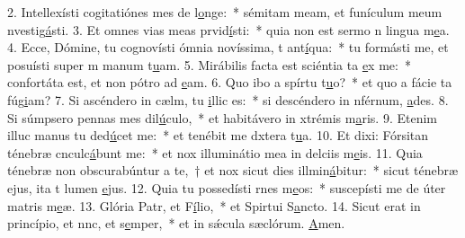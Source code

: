2. Intellexísti cogitatiónes mes de l\uline{o}nge:~* sémitam meam, et funículum meum nvestig\uline{á}sti.
3. Et omnes vias meas prvid\uline{í}sti:~* quia non est sermo n lingua m\uline{e}a.
4. Ecce, Dómine, tu cognovísti ómnia novíssima, t ant\uline{í}qua:~* tu formásti me, et posuísti super m manum t\uline{u}am.
5. Mirábilis facta est sciéntia ta \uline{e}x me:~* confortáta est, et non pótro ad \uline{e}am.
6. Quo ibo a spírtu t\uline{u}o?~* et quo a fácie ta fúg\uline{i}am?
7. Si ascéndero in cælm, tu \uline{i}llic es:~* si descéndero in nférnum, \uline{a}des.
8. Si súmpsero pennas mes dil\uline{ú}culo,~* et habitávero in xtrémis m\uline{a}ris.
9. Etenim illuc manus tu ded\uline{ú}cet me:~* et tenébit me dxtera t\uline{u}a.
10. Et dixi: Fórsitan ténebræ cnculc\uline{á}bunt me:~* et nox illuminátio mea in delciis m\uline{e}is.
11. Quia ténebræ non obscurabúntur a te,~† et nox sicut dies illmin\uline{á}bitur:~* sicut ténebræ ejus, ita t lumen \uline{e}jus.
12. Quia tu possedísti rnes m\uline{e}os:~* suscepísti me de úter matris m\uline{e}æ.
13. Glória Patr, et F\uline{í}lio,~* et Spirtui S\uline{a}ncto.
14. Sicut erat in princípio, et nnc, et s\uline{e}mper,~* et in sǽcula sæclórum. \uline{A}men.
